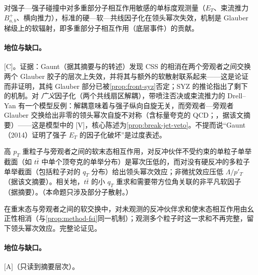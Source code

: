 \begin{conjecture}\label{conj:front-mpi-violation}
对强子—强子碰撞中对多重部分子相互作用敏感的单标度观测量（$E_T$、束流推力 $B^+_{a,b}$、横向推力），标准的硬—软—共线因子化在领头幂次失效，机制是 Glauber 梯级上的软辐射，即多重部分子相互作用（底层事件）的贡献。
\end{conjecture}

\paragraph{地位与缺口。}[C]。证据：Gaunt\cite{Gaunt2014}（据其摘要与\cite{Schwartz:2018obd}的转述）发现 CSS 的相消在两个旁观者之间交换两个 Glauber 胶子的层次上失效，并将其与额外的软散射联系起来——这是论证而非证明，其纯 Glauber 部分已被\cref{prop:front-syz}否定；SYZ 的推论指出了剩下的机制。对 \emph{广义}因子化（两个共线扇区解耦），带喷注否决或束流推力的 Drell--Yan 有一个模型反例：解耦意味着与强子纵向自旋无关，而旁观者—旁观者 Glauber 交换给出非零的领头幂次自旋不对称（含标量夸克的 QCD；\cite{Zeng:2015iba}，据该文摘要）——这是模型中的 [V]，核心陈述为\cref{prop:break-jet-veto}。不提\cite{Schwartz:2018obd}而说“Gaunt（2014）证明了强子 $E_T$ 的因子化破坏”是过度表述。

\begin{proposition}\label{prop:front-heavy-fsi}
高 $p_T$ 重粒子与旁观者之间的软末态相互作用，对反冲伙伴不受约束的单粒子单举截面（如 $t\bar t$ 中单个顶夸克的单举分布）是幂次压低的，而对没有硬反冲的多粒子单举截面（包括粒子对的 $q_T$ 分布）给出领头幂次效应；非微扰效应压低 $\Lambda/p'_T$\cite{Mitov:2012gt}（据该文摘要）。相关地，$t\bar t$ 的小 $q_T$ 重求和需要带方位角关联的非平凡软因子\cite{Catani:2014qha}（据摘要）。（本命题只涉及部分子散射。）
\end{proposition}

\begin{proofsketch}
在重末态与旁观者之间的软交换中，对未观测的反冲伙伴求和使末态相互作用由幺正性相消（与\cref{prop:method-fsi}同一机制）；观测多个粒子时这一求和不再完整，留下领头幂次效应。完整论证见\cite{Mitov:2012gt}。
\end{proofsketch}

\paragraph{地位与缺口。}[A]（只读到摘要层次）。

